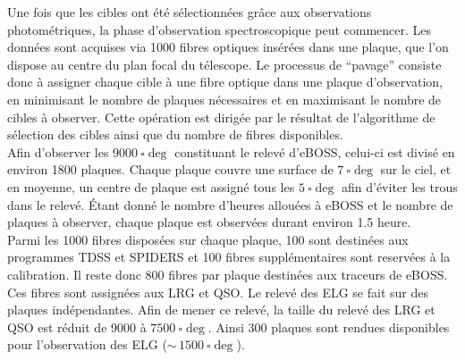 \documentclass[11pt, twoside, a4paper, openright]{report}
\begin{document}
Une fois que les cibles ont été sélectionnées grâce aux observations photométriques, la phase d'observation spectroscopique peut commencer. Les données sont acquises via \num{1000} fibres optiques insérées dans une plaque, que l'on dispose au centre du plan focal du télescope. 
Le processus de ``pavage'' \autocite{Blanton2001} consiste donc à assigner chaque cible à une fibre optique dans une plaque d'observation, en minimisant le nombre de plaques nécessaires et en maximisant le nombre de cibles à observer. Cette opération est dirigée par le résultat de l'algorithme de sélection des cibles ainsi que du nombre de fibres disponibles. \\
Afin d'observer les $\SI{9000}{\square\deg}$ constituant le relevé d'eBOSS, celui-ci est divisé en environ \num{1800} plaques. Chaque plaque couvre une surface de $\SI{7}{\square\deg}$ sur le ciel, et en moyenne, un centre de plaque est assigné tous les $\SI{5}{\square\deg}$ afin d'éviter les trous dans le relevé. Étant donné le nombre d'heures allouées à eBOSS et le nombre de plaques à observer, chaque plaque est observées durant environ \num{1,5} heure. \\
Parmi les \num{1000} fibres disposées sur chaque plaque, \num{100} sont destinées aux programmes TDSS et SPIDERS et \num{100} fibres supplémentaires sont reservées à la calibration. Il reste donc \num{800} fibres par plaque destinées aux traceurs de eBOSS. Ces fibres sont assignées aux LRG et QSO. Le relevé des ELG se fait sur des plaques indépendantes. Afin de mener ce relevé, la taille du relevé des LRG et QSO est réduit de \num{9000} à $\SI{7500}{\square\deg}$. Ainsi \num{300} plaques sont rendues disponibles pour l'observation des ELG ($\sim\,\SI{1500}{\square\deg}$).
\end{document}
